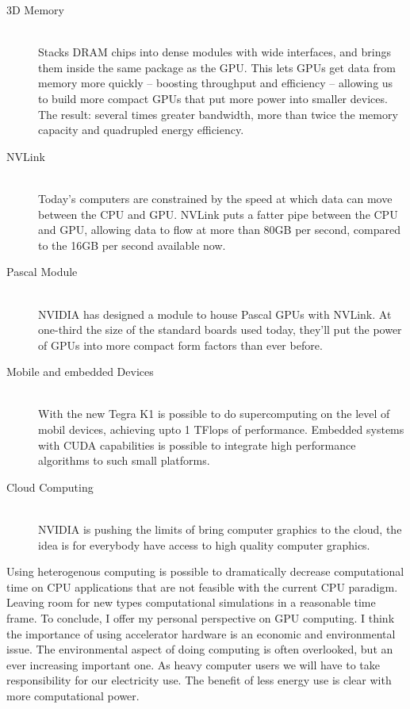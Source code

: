 \begin{description}
  \item[3D Memory] \hfill \\
 Stacks DRAM chips into dense modules with wide interfaces, and brings them inside the same package as the GPU. This lets GPUs get data from memory more quickly – boosting throughput and efficiency – allowing us to build more compact GPUs that put more power into smaller devices. The result: several times greater bandwidth, more than twice the memory capacity and quadrupled energy efficiency.
  
  \item[NVLink] \hfill \\
 Today’s computers are constrained by the speed at which data can move between the CPU and GPU. NVLink puts a fatter pipe between the CPU and GPU, allowing data to flow at more than 80GB per second, compared to the 16GB per second available now.
 
 \item[Pascal Module] \hfill \\ 
  NVIDIA has designed a module to house Pascal GPUs with NVLink. At one-third the size of the standard boards used today, they’ll put the power of GPUs into more compact form factors than ever before.
  
   \item[Mobile and embedded Devices] \hfill \\ 
   With the new Tegra K1 is possible to do supercomputing on the level of mobil devices, achieving upto 1 TFlops of performance. Embedded systems with CUDA capabilities is possible to integrate high performance algorithms to such small platforms. 
   \item[Cloud Computing] \hfill \\ 
   NVIDIA is pushing the limits of bring computer graphics to the cloud, the idea is for everybody have access to high quality computer graphics.
 
  \end{description}
  
\vspace{2.5em}


Using heterogenous computing is possible to dramatically decrease computational time on CPU applications that are not feasible with the current CPU paradigm. Leaving room for new types computational simulations in a reasonable time frame.  
To conclude, I offer my personal perspective on GPU computing. I think the importance of using accelerator hardware is an economic and environmental issue. The environmental aspect of doing computing is often overlooked, but an ever increasing important one. As heavy computer users we will have to take responsibility for our electricity use. The benefit of less energy use is clear with more computational power. 
